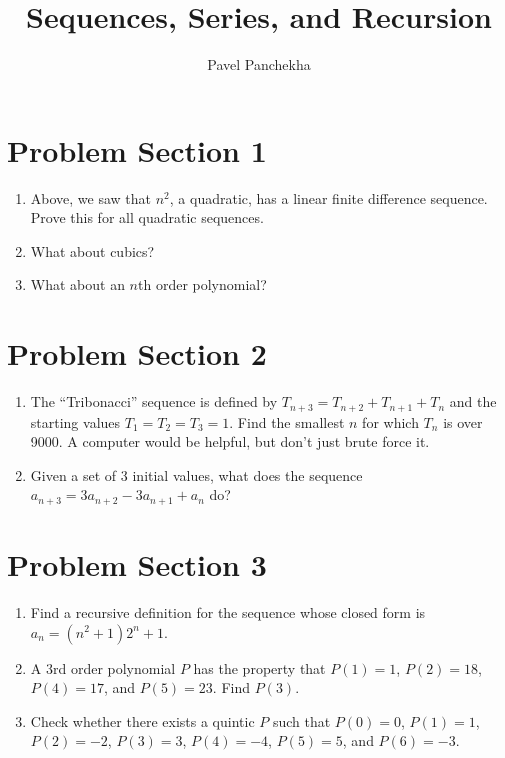 \documentclass[12pt,letterpaper]{article}
\author{Pavel Panchekha}
\title{Sequences, Series, and Recursion}
\begin{document}
\maketitle

\section{Problem Section 1}
\begin{enumerate}
\item Above, we saw that $n^2$, a quadratic, has a linear finite difference
sequence. Prove this for all quadratic sequences.
\item What about cubics?
\item What about an $n$th order polynomial?
\end{enumerate}

\section{Problem Section 2}
\begin{enumerate}
  \item The ``Tribonacci'' sequence is defined by $T_{n+3} = T_{n+2} + T_{n+1}
  + T_n$ and the starting values $T_1 = T_2 = T_3 = 1$. Find the smallest $n$
  for which $T_n$ is over 9000. A computer would be helpful, but don't just
  brute force it.
  \item Given a set of 3 initial values, what does the sequence $a_{n+3} =
  3a_{n+2} - 3a_{n+1} + a_n$ do?
\end{enumerate}

\section{Problem Section 3}
\begin{enumerate}
  \item Find a recursive definition for the sequence whose closed form is $a_n =
  (n^2 + 1) 2^n + 1$.
  \item A 3rd order polynomial $P$ has the property that $P(1) = 1$, $P(2) = 18$,
  $P(4) = 17$, and $P(5) = 23$. Find $P(3)$.
  \item Check whether there exists a quintic $P$ such that $P(0) = 0$, $P(1) = 1$, $P(2) = -2$,
  $P(3) = 3$, $P(4) = -4$, $P(5) = 5$, and $P(6) = -3$.
\end{enumerate}
\end{document}
